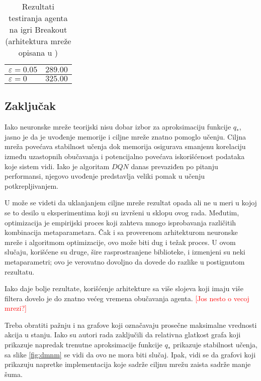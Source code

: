 \begin{table}
\centering
{\renewcommand{\arraystretch}{1.2}
 \begin{tabular}{|l|c|} 
 \hline 
 $\varepsilon = 0.05$ & $289.00$ \\
 \hline
 $\varepsilon = 0$ & $325.00$ \\

 \hline
\end{tabular} }
\caption{Rezultati testiranja agenta na igri Breakout (arhitektura mreže opisana u \cite{dqn_dm})}
\label{tbl:max_rez_big}
\end{table}

\subsection{Zaključak}

Iako neuronske mreže teorijski nisu dobar izbor za aproksimaciju funkcije $q_*$, jasno je da je uvođenje memorije i ciljne mreže znatno pomoglo učenju. Ciljna mreža povećava stabilnost učenja dok memorija osigurava smanjenu korelaciju između uzastopnih obučavanja i potencijalno povećava iskorišćenost podataka koje sistem vidi. Iako je algoritam $DQN$ danas prevaziđen po pitanju performansi, njegovo uvođenje predstavlja veliki pomak u učenju potkrepljivanjem.
\par 
U \cite{dqn_dm} može se videti da uklanjanjem ciljne mreže rezultat opada ali ne u meri u kojoj se to desilo u eksperimentima koji su izvršeni u sklopu ovog rada. Međutim, optimizacija je empirijski proces koji zahteva mnogo isprobavanja različitih kombinacija metaparametara. Čak i sa proverenom arhitekturom neuronske mreže i algoritmom optimizacije, ovo može biti dug i težak proces. U ovom slučaju, korišćene su druge, šire rasprostranjene biblioteke, i izmenjeni su neki metaparametri; ovo je verovatno dovoljno da dovede do razlike u postignutom rezultatu.
\par 
Iako daje bolje rezultate, korišćenje arhitekture sa više slojeva koji imaju više filtera dovelo je do znatno većeg vremena obučavanja agenta. 
\textcolor{red}{[Jos nesto o vecoj mrezi?]}
\par 
Treba obratiti pažnju i na grafove koji označavaju prosečne maksimalne vrednosti akcija u stanju. Iako su autori rada \cite{dqn_mnih} zaključili da relativna glatkost grafa koji prikazuje napredak trenutne aproksimacije funkcije $q_*$ prikazuje stabilnost učenja, sa slike \ref{fig:dmnm} se vidi da ovo ne mora biti slučaj. Ipak, vidi se da grafovi koji prikazuju napretke implementacija koje sadrže ciljnu mrežu zaista sadrže manje šuma.
